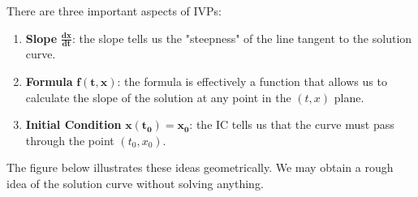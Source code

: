 \documentclass[10pt,letterpaper]{article}
\begin{document}
There are three important aspects of IVPs:
\begin{enumerate}
    \item \textbf{Slope} $\mathbf{\tfrac{dx}{dt}}$: the slope tells us the "steepness" of the line tangent to the solution curve.  
    \item \textbf{Formula} $\mathbf{f(t,x)}$: the formula is effectively a function that allows us to calculate the slope of the solution at any point in the $(t,x)$ plane.
    \item \textbf{Initial Condition} $\mathbf{x(t_0)=x_0}$: the IC tells us that the curve must pass through the point $(t_0, x_0)$. 
\end{enumerate}
The figure below illustrates these ideas geometrically. We may obtain a rough idea of the solution curve without solving anything.
\end{document}

